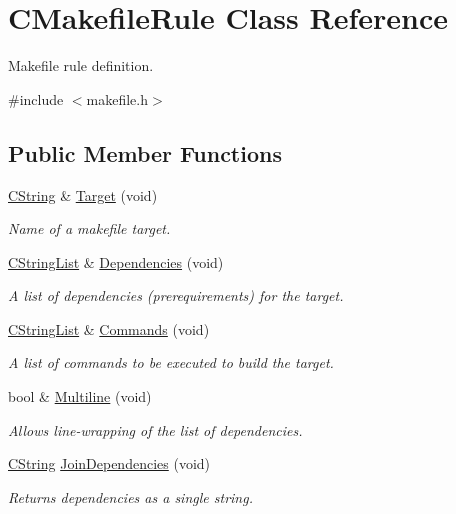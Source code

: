 \hypertarget{classCMakefileRule}{\section{C\-Makefile\-Rule Class Reference}
\label{classCMakefileRule}
}


Makefile rule definition.  




{\ttfamily \#include $<$makefile.\-h$>$}

\subsection*{Public Member Functions}
\begin{DoxyCompactItemize}
\item 
\hyperlink{classCString}{C\-String} \& \hyperlink{classCMakefileRule_af48330075190cc4fe5ff898b74ca01b6}{Target} (void)
\begin{DoxyCompactList}\small\item\em Name of a makefile target. \end{DoxyCompactList}\item 
\hyperlink{classCStringList}{C\-String\-List} \& \hyperlink{classCMakefileRule_af8474737e835958d4e2ab625ae39cadf}{Dependencies} (void)
\begin{DoxyCompactList}\small\item\em A list of dependencies (prerequirements) for the target. \end{DoxyCompactList}\item 
\hyperlink{classCStringList}{C\-String\-List} \& \hyperlink{classCMakefileRule_a1ac8c0575edeff1217c07a80f9b2b4c1}{Commands} (void)
\begin{DoxyCompactList}\small\item\em A list of commands to be executed to build the target. \end{DoxyCompactList}\item 
bool \& \hyperlink{classCMakefileRule_a089b52392be36d009142f8207a8fdef2}{Multiline} (void)
\begin{DoxyCompactList}\small\item\em Allows line-\/wrapping of the list of dependencies. \end{DoxyCompactList}\item 
\hyperlink{classCString}{C\-String} \hyperlink{classCMakefileRule_a5b6ffee5272a8fd46661f95f17adde73}{Join\-Dependencies} (void)
\begin{DoxyCompactList}\small\item\em Returns dependencies as a single string. \end{DoxyCompactList}\item 

\end{DoxyCompactItemize}
